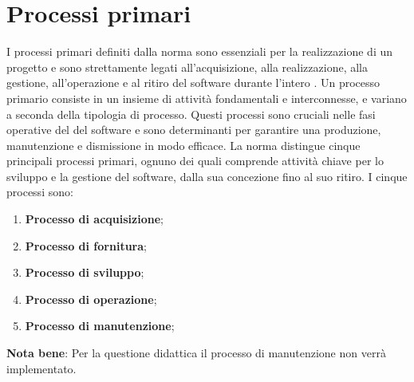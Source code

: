 \section{Processi primari}
\label{sec:Processi_Primari}
I processi primari definiti dalla norma  sono essenziali per la realizzazione di un progetto e sono strettamente legati all'acquisizione, alla realizzazione, alla gestione, all'operazione e al ritiro del software durante l'intero . 
Un processo primario consiste in un insieme di attività fondamentali e interconnesse, e variano a seconda della tipologia di processo.
Questi processi sono cruciali nelle fasi operative del  del software e sono determinanti per garantire una produzione, manutenzione e dismissione in modo efficace. La norma distingue cinque principali processi primari, ognuno dei quali comprende attività chiave per lo sviluppo e la gestione del software, dalla sua concezione fino al suo ritiro.
I cinque processi sono:
\begin{enumerate}
    \item \textbf{Processo di acquisizione}; 
    \item \textbf{Processo di fornitura}; 
    \item \textbf{Processo di sviluppo};
    \item \textbf{Processo di operazione}; 
    \item \textbf{Processo di manutenzione};
\end{enumerate}
\textbf{Nota bene}: Per la questione didattica il processo di manutenzione non verrà implementato.





